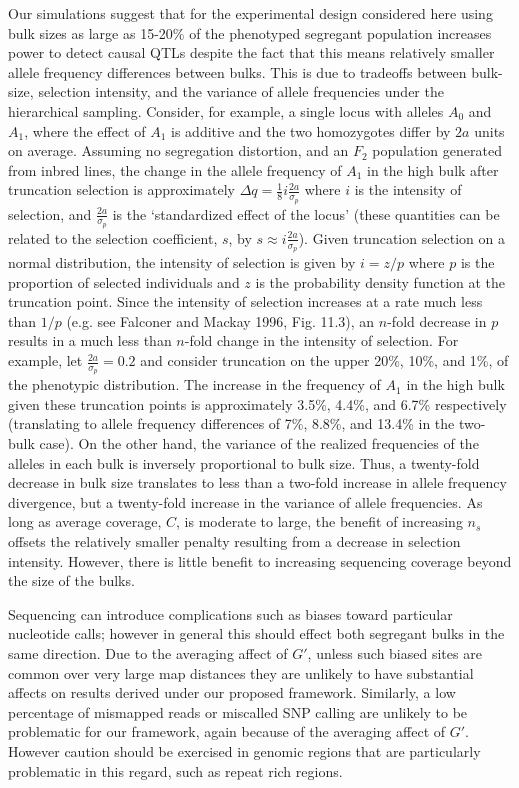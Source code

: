 Our simulations suggest that for the experimental design considered here using
bulk sizes as large as 15-20\% of the phenotyped segregant population increases
power to detect causal QTLs despite the fact that this means relatively smaller
allele frequency differences between bulks. This is due to tradeoffs between
bulk-size, selection intensity, and the variance of allele frequencies under
the hierarchical sampling.  Consider, for example, a single locus with alleles
$A_0$ and $A_1$, where the effect of $A_1$ is additive and the two homozygotes
differ by $2a$ units on average. Assuming no segregation distortion, and an
$F_2$ population generated from inbred lines, the change in the allele
frequency of $A_1$ in the high bulk after truncation selection is approximately
$\Delta q = \frac{1}{8}i\frac{2a}{\sigma_p}$ where $i$ is the intensity of
selection, and $\frac{2a}{\sigma_p}$ is the `standardized effect of the locus'
(these quantities can be related to the selection coefficient, $s$, by $s
\approx i\frac{2a}{\sigma_p}$). Given truncation selection on a normal
distribution, the intensity of selection is given by $i=z/p$ where $p$ is the
proportion of selected individuals and $z$ is the probability density function
at the truncation point. Since the intensity of selection increases at a rate
much less than $1/p$ (e.g. see Falconer and Mackay 1996, Fig. 11.3), an
$n$-fold decrease in  $p$ results in a much less than $n$-fold change in the
intensity of selection. For example, let $\frac{2a}{\sigma_p}=0.2$ and consider
truncation on the upper 20\%, 10\%, and 1\%, of the phenotypic distribution.
The increase in the frequency of $A_1$ in the high bulk given these truncation
points is approximately 3.5\%, 4.4\%, and 6.7\% respectively (translating to
allele frequency differences of 7\%, 8.8\%, and 13.4\% in the two-bulk case).
On the other hand, the variance of the realized frequencies of the alleles in
each bulk is inversely proportional to bulk size. Thus, a twenty-fold decrease
in bulk size translates to less than a two-fold increase in allele frequency
divergence, but a twenty-fold increase in the variance of allele frequencies.
As long as average coverage, $C$, is moderate to large, the benefit of
increasing $n_s$ offsets the relatively smaller penalty resulting from a
decrease in selection intensity. However, there is little benefit to increasing
sequencing coverage beyond the size of the bulks.  

Sequencing can introduce complications such as biases toward particular nucleotide calls; however in general this should effect both segregant bulks in the same direction.  Due to the averaging affect of $G'$, unless such biased sites are common over very large map distances they are unlikely to have substantial affects on results derived under our proposed framework.  Similarly, a low percentage of mismapped reads or miscalled SNP calling are unlikely to be problematic for our framework, again because of the averaging affect of $G'$. However caution should be exercised in genomic regions that are particularly problematic in this regard, such as repeat rich regions.


